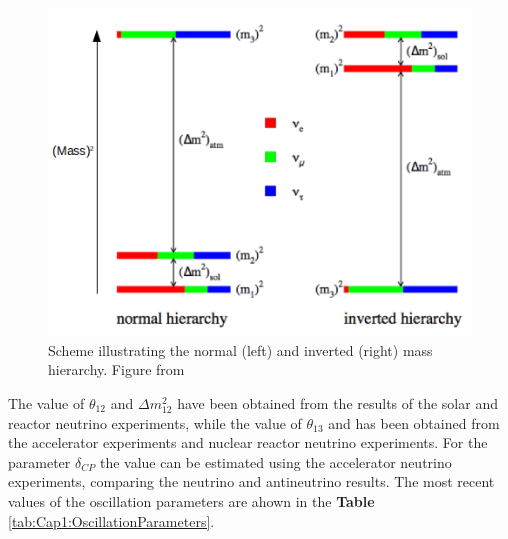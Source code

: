 \begin{figure}[!htb]
    \centering
    \includegraphics[scale=0.4]{Figures/Chapter1/MassHierarchy.png}
    \caption{Scheme illustrating the normal (left) and inverted (right) mass hierarchy. Figure from \cite{AaronThesis}}
    \label{fig:Cap1:MassHierarchy}
\end{figure}

The value of $\theta_{12}$ and $\Delta m^2_{12}$ have been obtained from the results of the solar and reactor neutrino experiments, while the value of $\theta_{13}$ and has been obtained from the accelerator experiments and nuclear reactor neutrino experiments. For the parameter $\delta_{CP}$ the value can be estimated using the accelerator neutrino experiments, comparing the neutrino and antineutrino results. The most recent values of the oscillation parameters are ahown in the \textbf{Table} \ref{tab:Cap1:OscillationParameters}.

